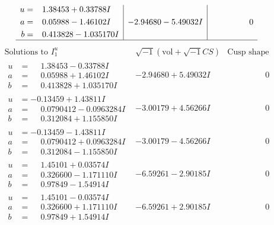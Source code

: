 \documentclass[1p]{elsarticle_modified}
\theoremstyle{definition}
\newcommand{\I}{\sqrt{-1}}
\begin{document}
$$\begin{array}{c|c|c}
\begin{aligned}
u &= \phantom{-}1.38453 + 0.33788 I \\
a &= \phantom{-}0.05988 - 1.46102 I \\
b &= \phantom{-}0.413828 - 1.035170 I\end{aligned}
 & -2.94680 - 5.49032 I & \phantom{-0.000000 } 0\\
 \hline 
 \end{array}$$\newpage$$\begin{array}{c|c|c}  
\text{Solutions to }I^u_{1}& \I (\text{vol} + \sqrt{-1}CS) & \text{Cusp shape}\\
 \hline 
\begin{aligned}
u &= \phantom{-}1.38453 - 0.33788 I \\
a &= \phantom{-}0.05988 + 1.46102 I \\
b &= \phantom{-}0.413828 + 1.035170 I\end{aligned}
 & -2.94680 + 5.49032 I & \phantom{-0.000000 } 0 \\ \hline\begin{aligned}
u &= -0.13459 + 1.43811 I \\
a &= \phantom{-}0.0790412 - 0.0963284 I \\
b &= \phantom{-}0.312084 + 1.155850 I\end{aligned}
 & -3.00179 + 4.56266 I & \phantom{-0.000000 } 0 \\ \hline\begin{aligned}
u &= -0.13459 - 1.43811 I \\
a &= \phantom{-}0.0790412 + 0.0963284 I \\
b &= \phantom{-}0.312084 - 1.155850 I\end{aligned}
 & -3.00179 - 4.56266 I & \phantom{-0.000000 } 0 \\ \hline\begin{aligned}
u &= \phantom{-}1.45101 + 0.03574 I \\
a &= \phantom{-}0.326600 - 1.171110 I \\
b &= \phantom{-}0.97849 - 1.54914 I\end{aligned}
 & -6.59261 - 2.90185 I & \phantom{-0.000000 } 0 \\ \hline\begin{aligned}
u &= \phantom{-}1.45101 - 0.03574 I \\
a &= \phantom{-}0.326600 + 1.171110 I \\
b &= \phantom{-}0.97849 + 1.54914 I\end{aligned}
 & -6.59261 + 2.90185 I & \phantom{-0.000000 } 0 \\ \hline\begin{aligned}

\end{aligned}
\end{array}$$
\end{document}
